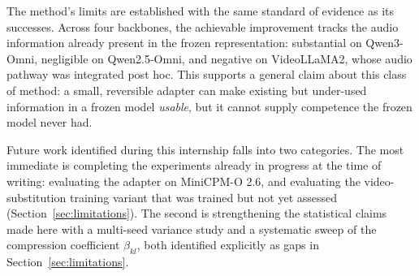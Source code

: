 \documentclass[11pt,a4paper,oneside]{article}
\begin{document}
The method's limits are established with the same standard of evidence as its successes. Across four
backbones, the achievable improvement tracks the audio information already present in the frozen
representation: substantial on Qwen3-Omni, negligible on Qwen2.5-Omni, and negative on VideoLLaMA2,
whose audio pathway was integrated post hoc. This supports a general claim about this class of
method: a small, reversible adapter can make existing but under-used information in a frozen model
\emph{usable}, but it cannot supply competence the frozen model never had.

Future work identified during this internship falls into two categories. The most immediate is
completing the experiments already in progress at the time of writing: evaluating the adapter on
MiniCPM-O 2.6, and evaluating the video-substitution training variant that was trained but not yet
assessed (Section~\ref{sec:limitations}). The second is strengthening the statistical claims made
here with a multi-seed variance study and a systematic sweep of the compression coefficient
$\beta_{kl}$, both identified explicitly as gaps in Section~\ref{sec:limitations}.
\end{document}
